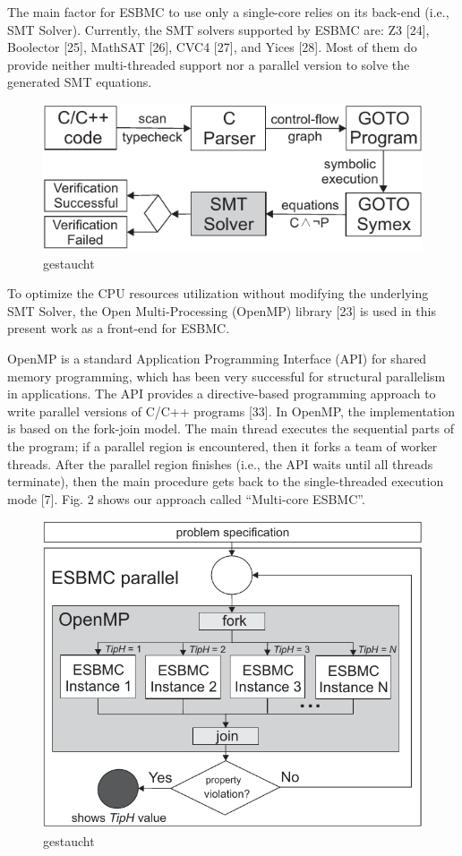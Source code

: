 The main factor for ESBMC to use only a single-core relies on its back-end (i.e., SMT Solver). Currently, the SMT solvers supported by ESBMC are: Z3 [24], Boolector [25], MathSAT [26], CVC4 [27], and Yices [28]. Most of them do provide neither multi-threaded support nor a parallel version to solve the generated SMT equations.
\begin{figure}[ht]
	\centering
  \includegraphics[scale=0.9]{Image/esbmc-arch-new.pdf} 
	\caption{gestaucht}
\end{figure}

To optimize the CPU resources utilization without modifying the underlying SMT Solver, the Open Multi-Processing (OpenMP) library [23] is used in this present work as a front-end for ESBMC.

OpenMP is a standard Application Programming Interface (API) for shared memory programming, which has been very successful for structural parallelism in applications. The API provides a directive-based programming approach to write parallel versions of C/C++ programs [33]. In OpenMP, the implementation is based on the fork-join model. The main thread executes the sequential parts of the program; if a parallel region is encountered, then it forks a team of worker threads. After the parallel region finishes (i.e., the API waits until all threads terminate), then the main procedure gets back to the single-threaded execution mode [7]. Fig. 2 shows our approach called “Multi-core ESBMC”.
\begin{figure}[ht]
	\centering
  \includegraphics[scale=0.75]{Image/esbmc-parallel.pdf} 
	\caption{gestaucht}
\end{figure}

